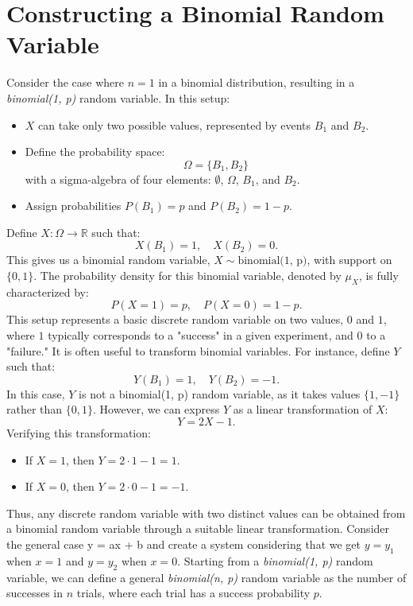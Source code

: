 \section{Constructing a Binomial Random Variable}

Consider the case where \( n = 1 \) in a binomial distribution, resulting in a \textit{binomial(1, p)} random variable. In this setup:
\begin{itemize}
    \item \( X \) can take only two possible values, represented by events \( B_1 \) and \( B_2 \).
    \item Define the probability space: 
    \[
    \Omega = \{B_1, B_2\}
    \]
    with a sigma-algebra of four elements: \(\emptyset\), \(\Omega\), \(B_1\), and \(B_2\).
    \item Assign probabilities \(P(B_1) = p\) and \(P(B_2) = 1 - p\).
\end{itemize}
Define \( X: \Omega \rightarrow \mathbb{R} \) such that:
\[
X(B_1) = 1, \quad X(B_2) = 0.
\]
This gives us a binomial random variable, \( X \sim \text{binomial(1, p)} \), with support on \(\{0, 1\}\). The probability density for this binomial variable, denoted by \( \mu_X \), is fully characterized by:
\[
P(X = 1) = p, \quad P(X = 0) = 1 - p.
\]
This setup represents a basic discrete random variable on two values, \(0\) and \(1\), where \(1\) typically corresponds to a "success" in a given experiment, and \(0\) to a "failure." \newline
It is often useful to transform binomial variables. For instance, define \( Y \) such that:
\[
Y(B_1) = 1, \quad Y(B_2) = -1.
\]
In this case, \( Y \) is not a binomial(1, p) random variable, as it takes values \( \{1, -1\} \) rather than \( \{0, 1\} \). However, we can express \( Y \) as a linear transformation of \( X \):
\[
Y = 2X - 1.
\]
Verifying this transformation:
\begin{itemize}
    \item If \( X = 1 \), then \( Y = 2 \cdot 1 - 1 = 1 \).
    \item If \( X = 0 \), then \( Y = 2 \cdot 0 - 1 = -1 \).
\end{itemize}
Thus, any discrete random variable with two distinct values can be obtained from a binomial random variable through a suitable linear transformation. Consider the general case y = ax + b and create a system considering that we get $y=y_1$ when $x=1$ and $y=y_2$ when $x=0$. \newline
Starting from a \textit{binomial(1, p)} random variable, we can define a general \textit{binomial(n, p)} random variable as the number of successes in \( n \) trials, where each trial has a success probability \( p \). \newline
